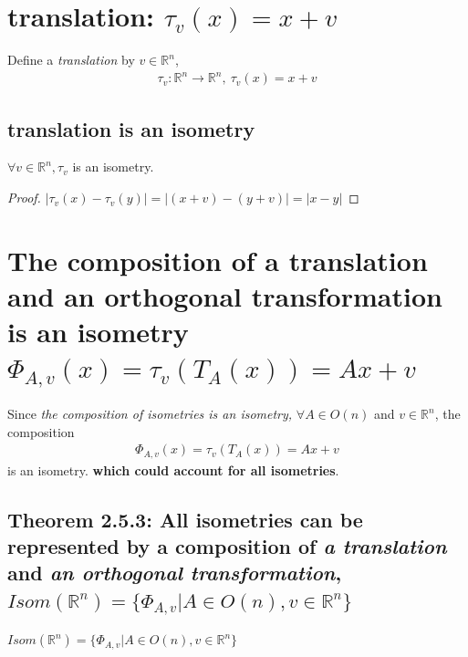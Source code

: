 \documentclass[11pt]{elegantbook}
\begin{document}
\section{translation: $\tau_v(x)=x+v$}
Define a \textit{translation} by $v\in \mathbb{R}^n$,
\begin{equation}
    \begin{aligned}
        \tau_v:\mathbb{R}^n \rightarrow \mathbb{R}^n,\ \tau_v(x)=x+v
    \end{aligned}
    \nonumber
\end{equation}
\subsection{translation is an isometry}
\begin{note}[Exercise 2.5.3]
$\forall v\in \mathbb{R}^n, \tau_v$ is an isometry.
\end{note}
\begin{proof}
$|\tau_v(x)-\tau_v(y)|=|(x+v)-(y+v)|=|x-y|$
\end{proof}

\section{The composition of a translation and an orthogonal transformation is an isometry $\Phi_{A,v}(x)=\tau_v(T_A(x))=Ax+v$}
Since \textit{the composition of isometries is an isometry,} $\forall A\in O(n)$ and $v\in \mathbb{R}^n$, the composition
\begin{equation}
    \begin{aligned}
        \Phi_{A,v}(x)=\tau_v(T_A(x))=Ax+v
    \end{aligned}
    \nonumber
\end{equation}
is an isometry. \textbf{which could account for all isometries}.
\subsection{Theorem 2.5.3: All isometries can be represented by a composition of \textit{a translation} and \textit{an orthogonal transformation}, $Isom(\mathbb{R}^n)=\{\Phi_{A,v}|A\in O(n), v\in \mathbb{R}^n \}$}
\begin{theorem}[Theorem 2.5.3]
$Isom(\mathbb{R}^n)=\{\Phi_{A,v}|A\in O(n), v\in \mathbb{R}^n \}$
\end{theorem}
\end{document}
